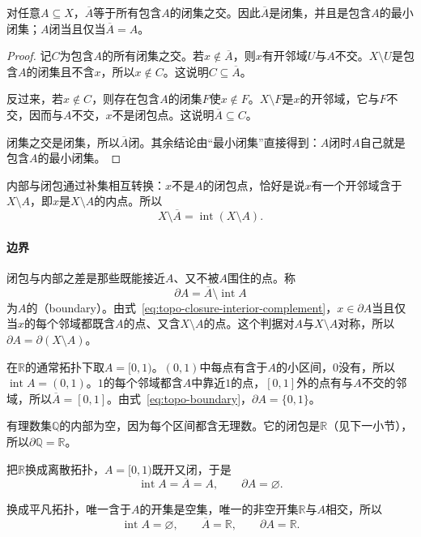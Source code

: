 \begin{theorem}[闭包是最小闭超集]
\label{thm:topo-closure-smallest-closed}
对任意$A\subseteq X$，$\overline A$等于所有包含$A$的闭集之交。因此$\overline A$是闭集，并且是包含$A$的最小闭集；$A$闭当且仅当$\overline A=A$。
\end{theorem}
\begin{proof}
记$C$为包含$A$的所有闭集之交。若$x\notin\overline A$，则$x$有开邻域$U$与$A$不交。$X\setminus U$是包含$A$的闭集且不含$x$，所以$x\notin C$。这说明$C\subseteq\overline A$。

反过来，若$x\notin C$，则存在包含$A$的闭集$F$使$x\notin F$。$X\setminus F$是$x$的开邻域，它与$F$不交，因而与$A$不交，$x$不是闭包点。这说明$\overline A\subseteq C$。

闭集之交是闭集，所以$\overline A$闭。其余结论由“最小闭集”直接得到：$A$闭时$A$自己就是包含$A$的最小闭集。
\end{proof}

内部与闭包通过补集相互转换：$x$不是$A$的闭包点，恰好是说$x$有一个开邻域含于$X\setminus A$，即$x$是$X\setminus A$的内点。所以
\begin{equation}
 X\setminus\overline A=\operatorname{int}(X\setminus A).
 \label{eq:topo-closure-interior-complement}
\end{equation}

\paragraph{边界}
闭包与内部之差是那些既能接近$A$、又不被$A$围住的点。称
\begin{equation}
 \partial A=\overline A\setminus\operatorname{int}A
 \label{eq:topo-boundary}
\end{equation}
为$A$的（boundary）。由式~\eqref{eq:topo-closure-interior-complement}，$x\in\partial A$当且仅当$x$的每个邻域都既含$A$的点、又含$X\setminus A$的点。这个判据对$A$与$X\setminus A$对称，所以$\partial A=\partial(X\setminus A)$。

\begin{example}[同一集合在不同拓扑下]
\label{ex:topo-interior-closure-examples}
在$\mathbb R$的通常拓扑下取$A=[0,1)$。$(0,1)$中每点有含于$A$的小区间，$0$没有，所以$\operatorname{int}A=(0,1)$。$1$的每个邻域都含$A$中靠近$1$的点，$[0,1]$外的点有与$A$不交的邻域，所以$\overline A=[0,1]$。由式~\eqref{eq:topo-boundary}，$\partial A=\{0,1\}$。

有理数集$\mathbb Q$的内部为空，因为每个区间都含无理数。它的闭包是$\mathbb R$（见下一小节），所以$\partial\mathbb Q=\mathbb R$。

把$\mathbb R$换成离散拓扑，$A=[0,1)$既开又闭，于是
\[
 \operatorname{int}A=\overline A=A,\qquad\partial A=\varnothing.
\]

换成平凡拓扑，唯一含于$A$的开集是空集，唯一的非空开集$\mathbb R$与$A$相交，所以
\[
 \operatorname{int}A=\varnothing,\qquad\overline A=\mathbb R,\qquad\partial A=\mathbb R.
\]
\end{example}

